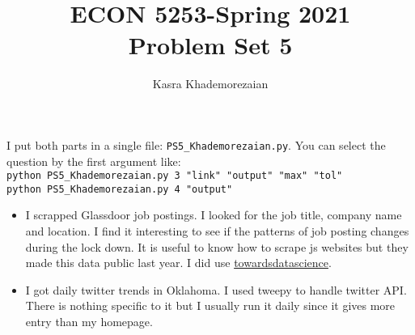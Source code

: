 \documentclass[12pt]{article}
\title{ECON 5253-Spring 2021\\
Problem Set 5}
\author{Kasra Khademorezaian}
\begin{document}
\maketitle
\noindent
I put both parts in  a single file: \verb|PS5_Khademorezaian.py|. You can select the question by the first argument like:\\
\verb|python PS5_Khademorezaian.py 3 "link" "output" "max" "tol"|\\
\verb|python PS5_Khademorezaian.py 4 "output"|
\begin{itemize}
    
    \item I scrapped Glassdoor job postings. I looked for the job title, company name and location. I find it interesting to see if the patterns of job posting changes during the lock down. It is useful to know how to scrape js websites but they made this data public last year. I did use \href{https://towardsdatascience.com/selenium-tutorial-scraping-glassdoor-com-in-10-minutes-3d0915c6d905}{towardsdatascience}.
    \item I got daily twitter trends in Oklahoma. I used tweepy to handle twitter API. There is nothing specific to it but I usually run it daily since it gives more entry than my homepage.

\end{itemize}
\end{document}
